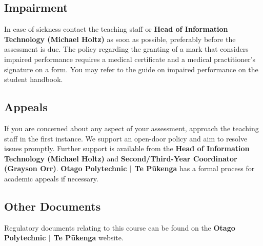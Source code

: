 \documentclass{article}
\begin{document}
\subsection*{Impairment}
In case of sickness contact the teaching staff or \textbf{Head of Information Technology (Michael Holtz)} as soon as possible, preferably before the assessment is due. The policy regarding the granting of a mark that considers impaired performance requires a medical certificate and a medical practitioner’s signature on a form. You may refer to the guide on impaired performance on the student handbook.

\subsection*{Appeals}
If you are concerned about any aspect of your assessment, approach the teaching staff in the first instance. We support an open-door policy and aim to resolve issues promptly. Further support is available from the \textbf{Head of Information Technology (Michael Holtz)} and \textbf{Second/Third-Year Coordinator (Grayson Orr)}. \textbf{Otago Polytechnic | Te Pūkenga} has a formal process for academic appeals if necessary.

\subsection*{Other Documents}
Regulatory documents relating to this course can be found on the \textbf{Otago Polytechnic | Te Pūkenga} website.
\end{document}
